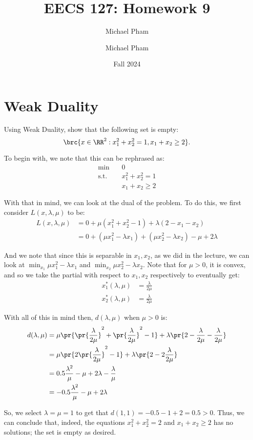 \documentclass{article}
\title{#1}
\author{Michael Pham}
\date{#2}
\renewcommand{\mytitle}[2]{%
	\title{#1}
	\author{Michael Pham}
	\date{#2}
	\maketitle
	\newpage
	\listoftheorems
	\newpage
}
\begin{document}
\mytitle{EECS 127: Homework 9}{Fall 2024}

\section{Weak Duality}
\begin{hw}{1}
	Using Weak Duality, show that the following set is empty:
	\begin{equation*}
		\brc{x \in \RR^{2} : x_1^{2} + x_2^{2} = 1 , x_1 + x_2 \geq 2}.
	\end{equation*}
\end{hw}
\begin{solution}
	To begin with, we note that this can be rephrased as:
	\begin{align*}
		\min &\quad 0 \\
		\mathrm{s.t.} &\quad x_1^{2} + x_2^{2} = 1 \\
		&\quad x_1 + x_2 \geq 2
	\end{align*}
	
	With that in mind, we can look at the dual of the problem. To do this, we first consider $L(x, \lambda, \mu)$ to be:
	\begin{align*}
		L(x, \lambda, \mu) &= 0 + \mu(x_1^{2} + x_2^{2} - 1) + \lambda(2 - x_1 - x_2) \\
		&= 0 + (\mu x_1^{2} - \lambda x_1) + (\mu x_2^{2} - \lambda x_2) - \mu + 2\lambda
	\end{align*}
	
	And we note that since this is separable in $x_1, x_2$, as we did in the lecture, we can look at $\min_{x_1} \mu x_1^{2} - \lambda x_1$ and $\min_{x_2} \mu x_2^{2} - \lambda x_2$. Note that for $\mu > 0$, it is convex, and so we take the partial with respect to $x_1, x_2$ respectively to eventually get:
	\begin{align*}
		x_1^{*}(\lambda, \mu) &= \frac{\lambda}{2\mu} \\
		x_2^{*}(\lambda, \mu) &= \frac{\lambda}{2\mu}
	\end{align*} 
	
	With all of this in mind then, $d(\lambda, \mu)$ when $\mu > 0$ is:
	\begin{align*}
		d(\lambda, \mu) &= \mu\pr{\pr{\frac{\lambda}{2\mu}}^{2} + \pr{\frac{\lambda}{2\mu}}^{2} - 1} + \lambda\pr{2 - \frac{\lambda}{2\mu} - \frac{\lambda}{2\mu}}\\
		&= \mu\pr{2\pr{\frac{\lambda}{2\mu}}^{2} - 1} + \lambda\pr{2 - 2\frac{\lambda}{2\mu}} \\
		&= 0.5\frac{\lambda^{2}}{\mu} - \mu + 2\lambda - \frac{\lambda}{\mu} \\
		&= -0.5\frac{\lambda^{2}}{\mu} - \mu + 2\lambda
	\end{align*}
	
	So, we select $\lambda = \mu = 1$ to get that $d(1,1) = -0.5 - 1 + 2 = 0.5 > 0$. Thus, we can conclude that, indeed, the equations $x_1^{2} + x_2^{2} = 2$ and $x_1 + x_2 \geq 2$ has no solutions; the set is empty as desired.
\end{solution}
\end{document}
